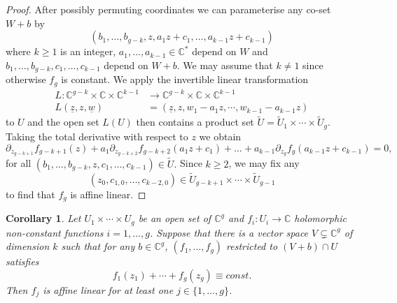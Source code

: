 \documentclass[12pt, reqno]{amsart}
\newcommand{\C}{\mathbb{C}}
\newtheorem{cor}[theorem]{Corollary}
\theoremstyle{remark}
\theoremstyle{definition}
\numberwithin{equation}{section}
\begin{document}
\begin{proof}
    After possibly permuting coordinates we can parameterise any co-set 
    $W + b$ by 
    $$(b_1, \dots, b_{g-k}, z,a_1 z + c_1,  \dots, a_{k-1}z + c_{k-1})$$ 
    where $k \geq 1$ is an integer, $a_1, \dots, a_{k-1} \in \C^*$ depend on $W$ and $b_1, \dots, b_{g-k}, c_1, \dots, c_{k-1}$ depend on $W + b$.  We may assume that $k \neq 1 $ since otherwise $f_g$ is constant. 
    We apply the invertible linear transformation 
\begin{align*}
L: \C^{g-k}\times \C\times \C^{k -1} & \rightarrow \C^{g-k}\times \C\times \C^{k -1} \\ 
    L(\underline{z},z, \underline{w}) & = (\underline{z},z, w_1 - a_1z, \cdots, w_{k-1}- a_{k-1}z)
\end{align*} 
to $U$ and the open set $L(U)$ then contains a product set $\tilde{U} = \tilde{U}_1\times \cdots \times \tilde{U}_g$. Taking the total derivative with respect to $z$ we obtain 
$$ \partial_{z_{g-k + 1}}f_{g-k + 1}(z) + a_1 \partial_{z_{g-k + 2}}f_{g-k + 2}(a_1z + c_1) + \dots + a_{k-1}\partial_{z_{g}}f_g(a_{k-1}z + c_{k-1}) =0,$$ 
for all $(b_1, \dots, b_{g-k},z, c_1, \dots,  c_{k-1}) \in \tilde{U}. $
Since $k \geq 2$, we may fix any 
\[(z_0, c_{1,0}, \dots, c_{k-2,0}) \in \tilde{U}_{g-k + 1}\times \cdots \times \tilde{U}_{g -1} \]
to find that $f_g$  is affine linear.  
\end{proof}


\begin{cor}\label{vs} Let $U_1\times \cdots \times U_g$ be an open set of $\mathbb{C}^g$ and $f_i: U_i \rightarrow \mathbb{C}$ holomorphic non-constant functions $i =1, \dots, g$. Suppose that there is a vector space $V\subsetneq \mathbb{C}^g$ of dimension $k $  such that for any $b \in \C^g$, $(f_1, \dots, f_g)$ restricted to $(V+ b) \cap U$ satisfies 
$$f_1(z_1) + \cdots + f_{g}(z_g) \equiv const.$$
Then  $f_j$ is affine linear for at least one $j \in \{ 1, \dots, g\}$. 
\end{cor}
\end{document}
